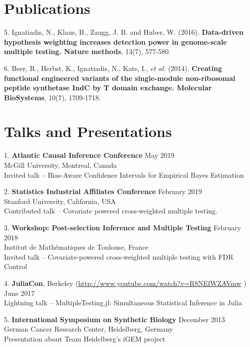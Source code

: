 \documentclass[margin,line]{res}
\newenvironment{list1}{
  \begin{list}{\ding{113}}{%
      \setlength{\itemsep}{0in}
      \setlength{\parsep}{0in} \setlength{\parskip}{0in}
      \setlength{\topsep}{0in} \setlength{\partopsep}{0in}
      \setlength{\leftmargin}{0.17in}}}{\end{list}}
\begin{document}
\begin{resume}
\begin{list1}
\end{list1}


\section{\sc Publications}
\begin{list1}
\item[5.]  Ignatiadis, N., Klaus, B., Zaugg, J. B. and Huber, W. (2016). \textbf{Data-driven hypothesis weighting increases detection power in genome-scale multiple testing. Nature methods}, 13(7), 577-580.
\item[6.] Beer, R., Herbst, K., Ignatiadis, N., Kats, I., \emph{et al.} (2014). \textbf{Creating functional engineered variants of the single-module non-ribosomal peptide synthetase IndC by T domain exchange. Molecular BioSystems}, 10(7), 1709-1718.
\end{list1}

\section{\sc Talks and Presentations}
\begin{list1}
\item[1.] \textbf{Atlantic Causal Inference Conference} \hfill May 2019\\
McGill University, Montreal, Canada\\
Invited talk -- Bias-Aware Confidence Intervals for Empirical Bayes Estimation
\item[2.] \textbf{Statistics Industrial Affiliates Conference} \hfill February 2019\\
Stanford University, California, USA\\
Contributed talk -- Covariate powered cross-weighted multiple testing.
\item[3.] \textbf{Workshop: Post-selection Inference and Multiple Testing} \hfill February 2018\\
Institut de Mathématiques de Toulouse, France\\
Invited talk -- Covariate-powered cross-weighted multiple testing with FDR Control
\item[4.] \textbf{JuliaCon}, Berkeley  (\url{http://www.youtube.com/watch?v=R8NEfWZAVmw}
) \hfill June 2017\\
Lightning talk -- MultipleTesting.jl: Simultaneous Statistical Inference in Julia
\item[5.] \textbf{International Symposium on Synthetic Biology} \hfill December 2013 \\German Cancer Research Center, Heidelberg, Germany\\
Presentation about Team Heidelberg's iGEM project
\end{list1}




\end{resume}
\end{document}
